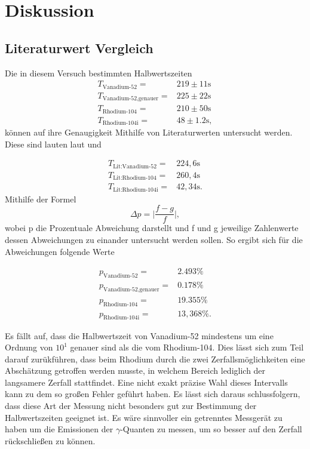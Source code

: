 \newpage
\section{Diskussion}
\label{sec:Diskussion}
\subsection{Literaturwert Vergleich}
Die in diesem Versuch bestimmten Halbwertszeiten 
\begin{align*}
    T_\text{Vanadium-52} =& 219 \pm 11 \si{\second}  \\
    T_\text{Vanadium-52,genauer} =& 225 \pm 22 \si{\second}  \\
    T_\text{Rhodium-104} =& 210 \pm 50 \si{\second} \\
    T_\text{Rhodium-104i} =& 48 \pm 1.2 \si{\second},
\end{align*}
\noindent
können auf ihre Genaugigkeit Mithilfe von Literaturwerten untersucht werden. Diese sind lauten laut \autocite{vanadium} und \autocite{rhodium}

\begin{align*}
    T_\text{Lit:Vanadium-52} =& 224,6 \si{\second}  \\
    T_\text{Lit:Rhodium-104} =& 260,4 \si{\second} \\
    T_\text{Lit:Rhodium-104i} =& 42,34  \si{\second}.
\end{align*}
\noindent 
Mithilfe der Formel 
\begin{equation*}
\Delta p = \bigg |\frac{f-g}{f} \bigg |,
\end{equation*}
\noindent
wobei p die Prozentuale Abweichung darstellt und f und g jeweilige Zahlenwerte dessen Abweichungen zu einander untersucht werden sollen. So ergibt sich für die Abweichungen folgende Werte

\begin{align*}
    p_\text{Vanadium-52} =&   2.493 \si{\percent}   \\
    p_\text{Vanadium-52,genauer} =& 0.178 \si{\percent}  \\
    p_\text{Rhodium-104} =&  19.355  \si{\percent}\\
    p_\text{Rhodium-104i} =&  13,368 \si{\percent}.
\end{align*}

\noindent
Es fällt auf, dass die Halbwertszeit von Vanadium-52 mindestens um eine Ordnung von $10^{1}$ genauer sind als die vom Rhodium-104. Dies lässt sich zum Teil darauf zurükführen,
dass beim Rhodium durch die zwei Zerfallsmöglichkeiten eine Abschätzung getroffen werden musste, in welchem Bereich lediglich der langsamere Zerfall stattfindet. Eine nicht exakt präzise
Wahl dieses Intervalls kann zu dem so großen Fehler geführt haben.
Es lässt sich daraus schlussfolgern, dass diese Art der Messung nicht besonders gut zur Bestimmung der Halbwertszeiten geeignet ist. Es wäre sinnvoller ein getrenntes Messgerät zu haben um die
Emissionen der $\gamma$-Quanten zu messen, um so besser auf den Zerfall rückschließen zu können.

